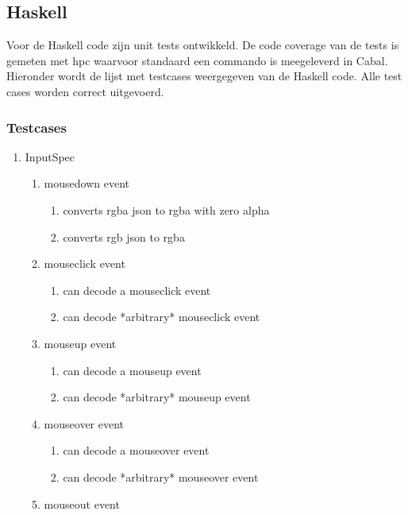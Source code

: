 \subsection{Haskell}
Voor de Haskell code zijn unit tests ontwikkeld. De code coverage van de tests is gemeten met hpc waarvoor standaard een commando is meegeleverd in Cabal. Hieronder wordt de lijst met testcases weergegeven van de Haskell code. Alle test cases worden correct uitgevoerd.


\subsubsection{Testcases}
\begin{enumerate}[{T}1]
	\setcounter{enumi}{\value{startvaluetest}}
	\item InputSpec
	\begin{enumerate}
		\item mousedown event
		\begin{enumerate}
			\item converts rgba json to rgba with zero alpha
			\item converts rgb json to rgba
		\end{enumerate}
		\item mouseclick event
		\begin{enumerate}
			\item can decode a mouseclick event
			\item can decode *arbitrary* mouseclick event
		\end{enumerate}
		\item mouseup event
		\begin{enumerate}
			\item can decode a mouseup event
			\item can decode *arbitrary* mouseup event
		\end{enumerate}
		\item mouseover event
		\begin{enumerate}
			\item can decode a mouseover event
			\item can decode *arbitrary* mouseover event
		\end{enumerate}
		\item mouseout event
		\begin{enumerate}

\end{enumerate}
\end{enumerate}
\end{enumerate}
